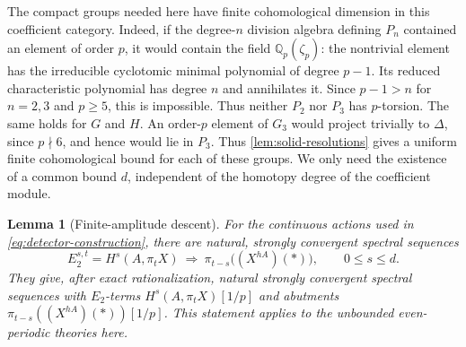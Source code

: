 \documentclass[11pt]{article}
\numberwithin{equation}{section}
\newtheorem{lemma}[theorem]{Lemma}
\theoremstyle{definition}
\theoremstyle{remark}
\begin{document}
The compact groups needed here have finite cohomological dimension in
this coefficient category.  Indeed, if the degree-$n$ division algebra
defining $P_n$ contained an element of order $p$, it would contain the
field $\mathbb Q_p(\zeta_p)$: the nontrivial element has the irreducible
cyclotomic minimal polynomial of degree $p-1$.  Its reduced
characteristic polynomial has degree $n$ and annihilates it.
Since $p-1>n$ for $n=2,3$ and $p\geq5$, this is impossible.
Thus neither $P_2$ nor $P_3$ has $p$-torsion.  The same holds for
$G$ and $H$.  An order-$p$ element of $G_3$ would project trivially to
$\Delta$, since $p\nmid6$, and hence would lie in $P_3$.  Thus
\cref{lem:solid-resolutions} gives a uniform finite cohomological bound
for each of these groups.  We only need the existence of a common bound
$d$, independent of the homotopy degree of the coefficient module.

\begin{lemma}[Finite-amplitude descent]\label{lem:descent-convergence}
For the continuous actions used in \eqref{eq:detector-construction},
there are natural, strongly convergent spectral sequences
\begin{equation}\label{eq:integral-descent-ss}
 E_2^{s,t}=H^s(A,\pi_tX)
       \ \Longrightarrow\ \pi_{t-s}\bigl((X^{hA})(*)\bigr),
 \qquad 0\leq s\leq d.
\end{equation}
They give, after exact rationalization, natural strongly convergent
spectral sequences with $E_2$-terms $H^s(A,\pi_tX)[1/p]$ and abutments
$\pi_{t-s}((X^{hA})(*))[1/p]$.
This statement applies to the unbounded even-periodic theories here.
\end{lemma}
\end{document}
